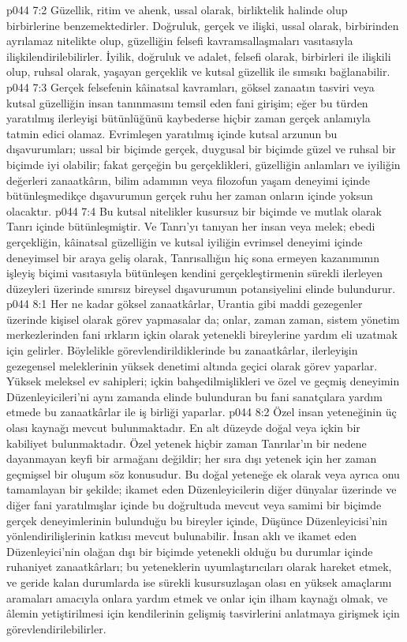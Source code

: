 \vs p044 7:2 Güzellik, ritim ve ahenk, ussal olarak, birliktelik halinde olup birbirlerine benzemektedirler. Doğruluk, gerçek ve ilişki, ussal olarak, birbirinden ayrılamaz nitelikte olup, güzelliğin felsefi kavramsallaşmaları vasıtasıyla ilişkilendirilebilirler. İyilik, doğruluk ve adalet, felsefi olarak, birbirleri ile ilişkili olup, ruhsal olarak, yaşayan gerçeklik ve kutsal güzellik ile sımsıkı bağlanabilir.
\vs p044 7:3 Gerçek felsefenin kâinatsal kavramları, göksel zanaatın tasviri veya kutsal güzelliğin insan tanınmasını temsil eden fani girişim; eğer bu türden yaratılmış ilerleyişi bütünlüğünü kaybederse hiçbir zaman gerçek anlamıyla tatmin edici olamaz. Evrimleşen yaratılmış içinde kutsal arzunun bu dışavurumları; ussal bir biçimde gerçek, duygusal bir biçimde güzel ve ruhsal bir biçimde iyi olabilir; fakat gerçeğin bu gerçeklikleri, güzelliğin anlamları ve iyiliğin değerleri zanaatkârın, bilim adamının veya filozofun yaşam deneyimi içinde bütünleşmedikçe dışavurumun gerçek ruhu her zaman onların içinde yoksun olacaktır.
\vs p044 7:4 Bu kutsal nitelikler kusursuz bir biçimde ve mutlak olarak Tanrı içinde bütünleşmiştir. Ve Tanrı’yı tanıyan her insan veya melek; ebedi gerçekliğin, kâinatsal güzelliğin ve kutsal iyiliğin evrimsel deneyimi içinde deneyimsel bir araya geliş olarak, Tanrısallığın hiç sona ermeyen kazanımının işleyiş biçimi vasıtasıyla bütünleşen kendini gerçekleştirmenin sürekli ilerleyen düzeyleri üzerinde sınırsız bireysel dışavurumun potansiyelini elinde bulundurur.
\vs p044 8:1 Her ne kadar göksel zanaatkârlar, Urantia gibi maddi gezegenler üzerinde kişisel olarak görev yapmasalar da; onlar, zaman zaman, sistem yönetim merkezlerinden fani ırkların içkin olarak yetenekli bireylerine yardım eli uzatmak için gelirler. Böylelikle görevlendirildiklerinde bu zanaatkârlar, ilerleyişin gezegensel meleklerinin yüksek denetimi altında geçici olarak görev yaparlar. Yüksek meleksel ev sahipleri; içkin bahşedilmişlikleri ve özel ve geçmiş deneyimin Düzenleyicileri’ni aynı zamanda elinde bulunduran bu fani sanatçılara yardım etmede bu zanaatkârlar ile iş birliği yaparlar.
\vs p044 8:2 Özel insan yeteneğinin üç olası kaynağı mevcut bulunmaktadır. En alt düzeyde  doğal veya içkin bir kabiliyet bulunmaktadır. Özel yetenek hiçbir zaman Tanrılar’ın bir nedene dayanmayan keyfi bir armağanı değildir; her sıra dışı yetenek için her zaman geçmişsel bir oluşum söz konusudur. Bu doğal yeteneğe ek olarak veya ayrıca onu tamamlayan bir şekilde; ikamet eden Düzenleyicilerin diğer dünyalar üzerinde ve diğer fani yaratılmışlar içinde bu doğrultuda mevcut veya samimi bir biçimde gerçek deneyimlerinin bulunduğu bu bireyler içinde, Düşünce Düzenleyicisi’nin yönlendirilişlerinin katkısı mevcut bulunabilir. İnsan aklı ve ikamet eden Düzenleyici’nin olağan dışı bir biçimde yetenekli olduğu bu durumlar içinde ruhaniyet zanaatkârları; bu yeteneklerin uyumlaştırıcıları olarak hareket etmek, ve geride kalan durumlarda ise sürekli kusursuzlaşan olası en yüksek amaçlarını aramaları amacıyla onlara yardım etmek ve onlar için ilham kaynağı olmak, ve âlemin yetiştirilmesi için kendilerinin gelişmiş tasvirlerini anlatmaya girişmek için görevlendirilebilirler.
